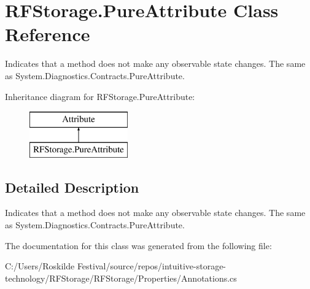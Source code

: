 \hypertarget{class_r_f_storage_1_1_pure_attribute}{}\section{R\+F\+Storage.\+Pure\+Attribute Class Reference}
\label{class_r_f_storage_1_1_pure_attribute}


Indicates that a method does not make any observable state changes. The same as {\ttfamily System.\+Diagnostics.\+Contracts.\+Pure\+Attribute}.  


Inheritance diagram for R\+F\+Storage.\+Pure\+Attribute\+:\begin{figure}[H]
\begin{center}
\leavevmode
\includegraphics[height=2.000000cm]{class_r_f_storage_1_1_pure_attribute}
\end{center}
\end{figure}


\subsection{Detailed Description}
Indicates that a method does not make any observable state changes. The same as {\ttfamily System.\+Diagnostics.\+Contracts.\+Pure\+Attribute}. 


\begin{DoxyCode}{0}
\DoxyCodeLine{}
\DoxyCodeLine{\}}
\end{DoxyCode}


The documentation for this class was generated from the following file\+:\begin{DoxyCompactItemize}
\item 
C\+:/\+Users/\+Roskilde Festival/source/repos/intuitive-\/storage-\/technology/\+R\+F\+Storage/\+R\+F\+Storage/\+Properties/Annotations.\+cs\end{DoxyCompactItemize}
